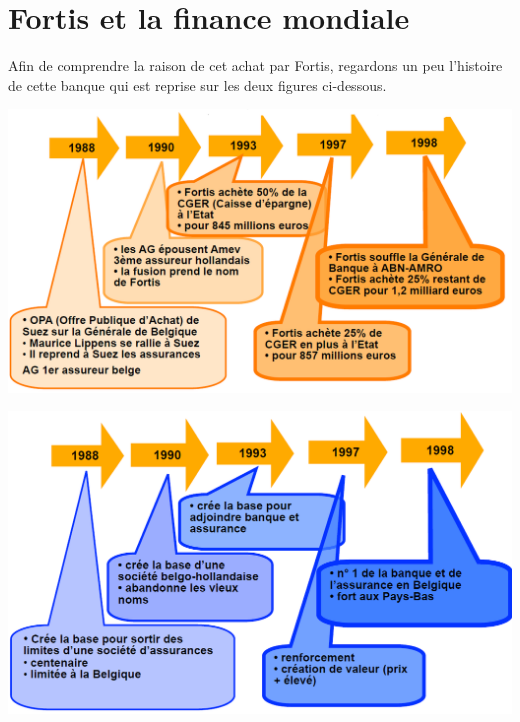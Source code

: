 \section{Fortis et la finance mondiale}
Afin de comprendre la raison de cet achat par Fortis, regardons un peu l'histoire de cette banque qui est reprise sur les deux figures ci-dessous.\\
\begin{minipage}{0.55\textwidth}
\begin{flushleft}
\includegraphics[scale=0.3]{8}
\end{flushleft}
\end{minipage} 
\begin{minipage}{0.5\textwidth}
\begin{flushright}
\includegraphics[scale=0.3]{9}
\end{flushright}
\end{minipage} \\

